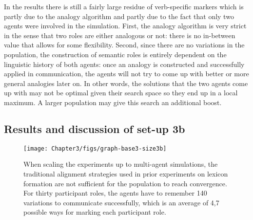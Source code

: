 In the results there is still a fairly large residue of verb-specific markers which is partly due to the analogy algorithm and partly due to the fact that only two agents were involved in the simulation. First, the analogy algorithm is very strict in the sense that two roles are either analogous or not: there is no in-between value that allows for some flexibility. Second, since there are no variations in the population, the construction of semantic roles is entirely dependent on the linguistic history of both agents: once an analogy is constructed and successfully applied in communication, the agents will not try to come up with better or more general analogies later on. In other words, the solutions that the two agents come up with may not be optimal given their search space so they end up in a local maximum. A larger population may give this search an additional boost.

\subsection{Results and discussion of set-up 3b}

\begin{figure}[ht]
\centerline{\texttt{[image: Chapter3/figs/graph-base3-size3b]}}
  \caption[Baseline experiment 3b: number of markers]{When scaling the experiments up to multi-agent simulations, the traditional alignment strategies used in prior experiments on lexicon formation are not sufficient for the population to reach convergence. For thirty participant roles, the agents have to remember 140 variations to communicate successfully, which is an average of 4,7 possible ways for marking each participant role.}
   \label{f:base3-size3b}
\end{figure}

